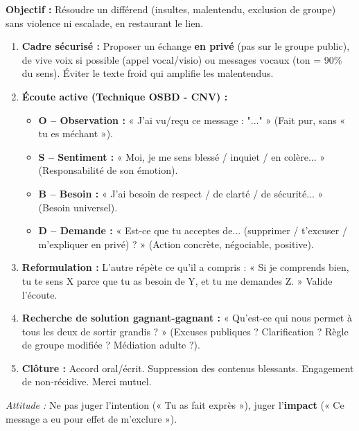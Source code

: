 \documentclass[11pt]{article}
\begin{document}
\begin{methode}
\textbf{Objectif :} Résoudre un différend (insultes, malentendu, exclusion de groupe) sans violence ni escalade, en restaurant le lien.
\begin{enumerate}
    \item \textbf{Cadre sécurisé :} Proposer un échange \textbf{en privé} (pas sur le groupe public), de vive voix si possible (appel vocal/visio) ou messages vocaux (ton = 90\% du sens). Éviter le texte froid qui amplifie les malentendus.
    \item \textbf{Écoute active (Technique OSBD - CNV) :}
    \begin{itemize}
        \item \textbf{O -- Observation :} « J'ai vu/reçu ce message : "..." » (Fait pur, sans « tu es méchant »).
        \item \textbf{S -- Sentiment :} « Moi, je me sens blessé / inquiet / en colère... » (Responsabilité de son émotion).
        \item \textbf{B -- Besoin :} « J'ai besoin de respect / de clarté / de sécurité... » (Besoin universel).
        \item \textbf{D -- Demande :} « Est-ce que tu acceptes de... (supprimer / t'excuser / m'expliquer en privé) ? » (Action concrète, négociable, positive).
    \end{itemize}
    \item \textbf{Reformulation :} L'autre répète ce qu'il a compris : « Si je comprends bien, tu te sens X parce que tu as besoin de Y, et tu me demandes Z. » Valide l'écoute.
    \item \textbf{Recherche de solution gagnant-gagnant :} « Qu'est-ce qui nous permet à tous les deux de sortir grandis ? » (Excuses publiques ? Clarification ? Règle de groupe modifiée ? Médiation adulte ?).
    \item \textbf{Clôture :} Accord oral/écrit. Suppression des contenus blessants. Engagement de non-récidive. Merci mutuel.
\end{enumerate}
\emph{Attitude :} Ne pas juger l'intention (« Tu as fait exprès »), juger l'\textbf{impact} (« Ce message a eu pour effet de m'exclure »).
\end{methode}
\end{document}
